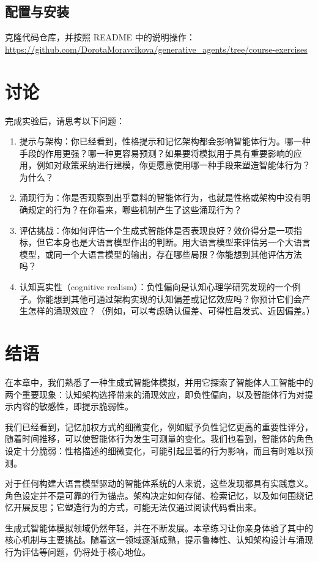 \subsection{配置与安装}

克隆代码仓库，并按照 README 中的说明操作：\\
\url{https://github.com/DorotaMoravcikova/generative_agents/tree/course-exercises}




\section{讨论}

完成实验后，请思考以下问题：

\begin{enumerate}

\item 提示与架构：你已经看到，性格提示和记忆架构都会影响智能体行为。哪一种手段的作用更强？哪一种更容易预测？如果要将模拟用于具有重要影响的应用，例如对政策采纳进行建模，你更愿意使用哪一种手段来塑造智能体行为？为什么？

\item 涌现行为：你是否观察到出乎意料的智能体行为，也就是性格或架构中没有明确规定的行为？在你看来，哪些机制产生了这些涌现行为？

\item 评估挑战：你如何评估一个生成式智能体是否表现良好？效价得分是一项指标，但它本身也是大语言模型作出的判断。用大语言模型来评估另一个大语言模型，或同一个大语言模型的输出，存在哪些局限？你能想到其他评估方法吗？

\item 认知真实性（cognitive realism）：负性偏向是认知心理学研究发现的一个例子。你能想到其他可通过架构实现的认知偏差或记忆效应吗？你预计它们会产生怎样的涌现效应？（例如，可以考虑确认偏差、可得性启发式、近因偏差。）

\end{enumerate}

\section{结语}

在本章中，我们熟悉了一种生成式智能体模拟，并用它探索了智能体人工智能中的两个重要现象：认知架构选择带来的涌现效应，即负性偏向，以及智能体行为对提示内容的敏感性，即提示脆弱性。

我们已经看到，记忆加权方式的细微变化，例如赋予负性记忆更高的重要性评分，随着时间推移，可以使智能体行为发生可测量的变化。我们也看到，智能体的角色设定十分脆弱：性格描述的细微变化，可能引起显著的行为影响，而且有时难以预测。

对于任何构建大语言模型驱动的智能体系统的人来说，这些发现都具有实践意义。角色设定并不是可靠的行为锚点。架构决定如何存储、检索记忆，以及如何围绕记忆开展反思；它塑造行为的方式，可能无法仅通过阅读代码看出来。

生成式智能体模拟领域仍然年轻，并在不断发展。本章练习让你亲身体验了其中的核心机制与主要挑战。随着这一领域逐渐成熟，提示鲁棒性、认知架构设计与涌现行为评估等问题，仍将处于核心地位。



